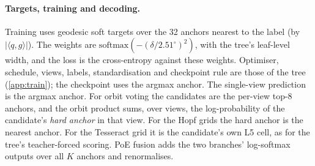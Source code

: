 \paragraph{Targets, training and decoding.}
Training uses geodesic soft targets over the 32 anchors nearest to the label (by $|\langle q,g\rangle|$). The weights are $\mathrm{softmax}(-(\delta/2.51^\circ)^2)$, with the tree's leaf-level width, and the loss is the cross-entropy against these weights. Optimiser, schedule, views, labels, standardisation and checkpoint rule are those of the tree (\cref{app:train}); the checkpoint uses the argmax anchor. The single-view prediction is the argmax anchor. For orbit voting the candidates are the per-view top-8 anchors, and the orbit product sums, over views, the log-probability of the candidate's \emph{hard anchor} in that view. For the Hopf grids the hard anchor is the nearest anchor. For the Tesseract grid it is the candidate's own L5 cell, as for the tree's teacher-forced scoring. PoE fusion adds the two branches' log-softmax outputs over all $K$ anchors and renormalises.
